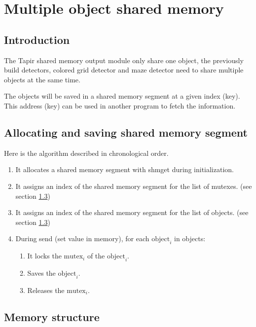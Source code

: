 \section{Multiple object shared memory}
\label{sec:mosm}

\subsection{Introduction}
\label{sec:mosm:intro}

The Tapir shared memory output module only share one object, the 
previously build detectors, colored grid detector and maze detector 
need to share multiple objects at the same time. 

The objects will be saved in a shared memory segment at a given index 
(key). This address (key) can be used in another program to fetch the 
information.

\subsection{Allocating and saving shared memory segment}
\label{sec:mosm:algo}
Here is the algorithm described in chronological order.

    \begin{enumerate}
        \item It allocates a shared memory segment with shmget during 
            initialization.
        \item It assigns an index of the shared memory segment for the list 
            of mutexes. (see section \ref{sec:mosm:ms})
        \item It assigns an index of the shared memory segment for the list 
            of objects. (see section \ref{sec:mosm:ms})
        \item During send (set value in memory), for each $\mbox{object}_i$ in objects:
        \begin{enumerate}
            \item It locks the $\mbox{mutex}_i$ of the $\mbox{object}_i$.
            \item Saves the $\mbox{object}_i$.
            \item Releases the $\mbox{mutex}_i$.
        \end{enumerate}
    \end{enumerate}

\subsection{Memory structure}
\label{sec:mosm:ms}

